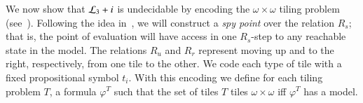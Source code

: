 \begin{pf}
\begin{center}
\end{center}

\end{pf}


We now show that $\mathcal{L}_3 + i$ is undecidable by encoding the
$\omega\times\omega$ tiling problem (see~\cite{BGG97}). Following
the idea in~\cite{BS95}, we will construct a \emph{spy point} over the relation
$R_s$; that is, the point of evaluation will have access in one $R_s$-step
to any reachable state in the model. The relations $R_u$ and $R_r$
represent moving up and to the right, respectively, from one tile to
the other. We code each type of tile with a fixed propositional
symbol $t_i$. With this encoding we define for each tiling problem
$T$, a formula $\varphi^T$ such that the set of tiles $T$ tiles
$\omega\times\omega$ iff $\varphi^T$ has a model.


